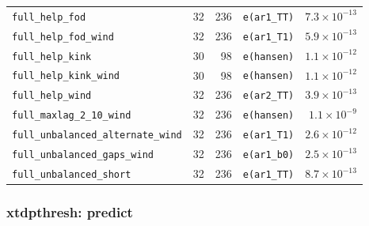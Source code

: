 \documentclass[
  10.5pt,
  a4paper,
]{article}
\begin{document}
\begin{longtable}{@{}p{3.6cm}rrp{4.9cm}r@{}}
\texttt{full\_\allowbreak{}help\_\allowbreak{}fod} & 32 & 236 & \texttt{e(ar1\_\allowbreak{}TT)} & $7.3\times10^{-13}$ \\
\texttt{full\_\allowbreak{}help\_\allowbreak{}fod\_\allowbreak{}wind} & 32 & 236 & \texttt{e(ar1\_\allowbreak{}T1)} & $5.9\times10^{-13}$ \\
\texttt{full\_\allowbreak{}help\_\allowbreak{}kink} & 30 & 98 & \texttt{e(hansen)} & $1.1\times10^{-12}$ \\
\texttt{full\_\allowbreak{}help\_\allowbreak{}kink\_\allowbreak{}wind} & 30 & 98 & \texttt{e(hansen)} & $1.1\times10^{-12}$ \\
\texttt{full\_\allowbreak{}help\_\allowbreak{}wind} & 32 & 236 & \texttt{e(ar2\_\allowbreak{}TT)} & $3.9\times10^{-13}$ \\
\texttt{full\_\allowbreak{}maxlag\_\allowbreak{}2\_\allowbreak{}10\_\allowbreak{}wind} & 32 & 236 & \texttt{e(hansen)} & $1.1\times10^{-9}$ \\
\texttt{full\_\allowbreak{}unbalanced\_\allowbreak{}alternate\_\allowbreak{}wind} & 32 & 236 & \texttt{e(ar1\_\allowbreak{}T1)} & $2.6\times10^{-12}$ \\
\texttt{full\_\allowbreak{}unbalanced\_\allowbreak{}gaps\_\allowbreak{}wind} & 32 & 236 & \texttt{e(ar1\_\allowbreak{}b0)} & $2.5\times10^{-13}$ \\
\texttt{full\_\allowbreak{}unbalanced\_\allowbreak{}short} & 32 & 236 & \texttt{e(ar1\_\allowbreak{}TT)} & $8.7\times10^{-13}$ \\
\bottomrule
\end{longtable}

\subsubsection*{xtdpthresh: predict}
\end{document}
